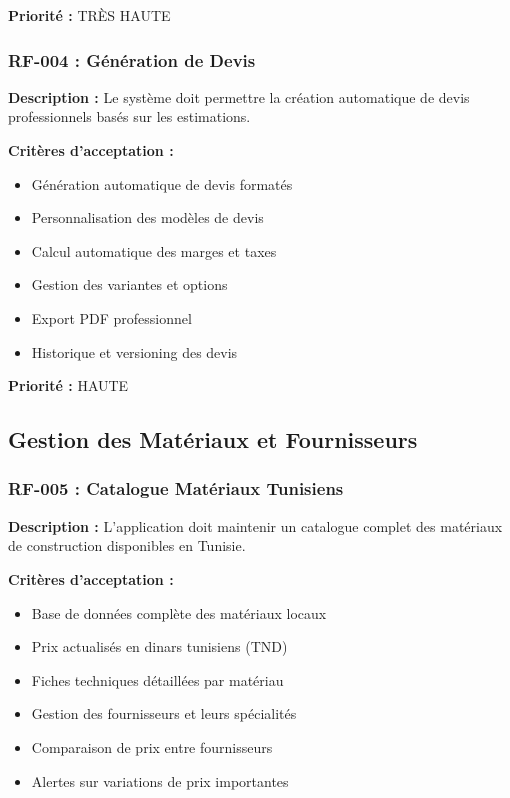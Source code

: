 \textbf{Priorité :} TRÈS HAUTE

\subsubsection{RF-004 : Génération de Devis}

\textbf{Description :} Le système doit permettre la création automatique de devis professionnels basés sur les estimations.

\textbf{Critères d'acceptation :}
\begin{itemize}
    \item Génération automatique de devis formatés
    \item Personnalisation des modèles de devis
    \item Calcul automatique des marges et taxes
    \item Gestion des variantes et options
    \item Export PDF professionnel
    \item Historique et versioning des devis
\end{itemize}

\textbf{Priorité :} HAUTE

\subsection{Gestion des Matériaux et Fournisseurs}

\subsubsection{RF-005 : Catalogue Matériaux Tunisiens}

\textbf{Description :} L'application doit maintenir un catalogue complet des matériaux de construction disponibles en Tunisie.

\textbf{Critères d'acceptation :}
\begin{itemize}
    \item Base de données complète des matériaux locaux
    \item Prix actualisés en dinars tunisiens (TND)
    \item Fiches techniques détaillées par matériau
    \item Gestion des fournisseurs et leurs spécialités
    \item Comparaison de prix entre fournisseurs
    \item Alertes sur variations de prix importantes
\end{itemize}

